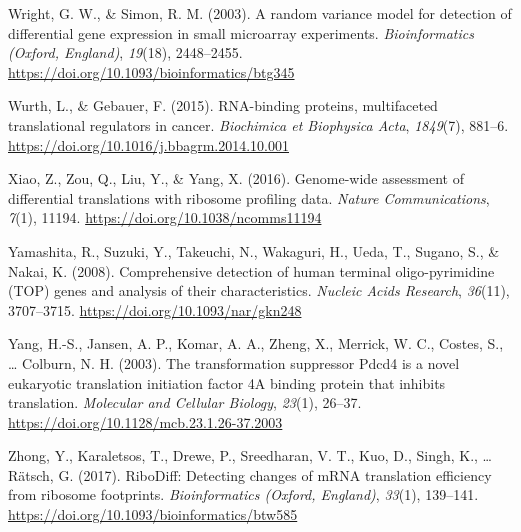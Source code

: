 \documentclass[12pt,openany]{book}
\begin{document}
\hypertarget{ref-Wright2003}{}
Wright, G. W., \& Simon, R. M. (2003). A random variance model for
detection of differential gene expression in small microarray
experiments. \emph{Bioinformatics (Oxford, England)}, \emph{19}(18),
2448--2455. \url{https://doi.org/10.1093/bioinformatics/btg345}

\hypertarget{ref-Wurth2015}{}
Wurth, L., \& Gebauer, F. (2015). RNA-binding proteins, multifaceted
translational regulators in cancer. \emph{Biochimica et Biophysica
Acta}, \emph{1849}(7), 881--6.
\url{https://doi.org/10.1016/j.bbagrm.2014.10.001}

\hypertarget{ref-Xiao2016}{}
Xiao, Z., Zou, Q., Liu, Y., \& Yang, X. (2016). Genome-wide assessment
of differential translations with ribosome profiling data. \emph{Nature
Communications}, \emph{7}(1), 11194.
\url{https://doi.org/10.1038/ncomms11194}

\hypertarget{ref-Yamashita2008}{}
Yamashita, R., Suzuki, Y., Takeuchi, N., Wakaguri, H., Ueda, T., Sugano,
S., \& Nakai, K. (2008). Comprehensive detection of human terminal
oligo-pyrimidine (TOP) genes and analysis of their characteristics.
\emph{Nucleic Acids Research}, \emph{36}(11), 3707--3715.
\url{https://doi.org/10.1093/nar/gkn248}

\hypertarget{ref-Yang2003}{}
Yang, H.-S., Jansen, A. P., Komar, A. A., Zheng, X., Merrick, W. C.,
Costes, S., \ldots{} Colburn, N. H. (2003). The transformation
suppressor Pdcd4 is a novel eukaryotic translation initiation factor 4A
binding protein that inhibits translation. \emph{Molecular and Cellular
Biology}, \emph{23}(1), 26--37.
\url{https://doi.org/10.1128/mcb.23.1.26-37.2003}

\hypertarget{ref-Zhong2017}{}
Zhong, Y., Karaletsos, T., Drewe, P., Sreedharan, V. T., Kuo, D., Singh,
K., \ldots{} Rätsch, G. (2017). RiboDiff: Detecting changes of mRNA
translation efficiency from ribosome footprints. \emph{Bioinformatics
(Oxford, England)}, \emph{33}(1), 139--141.
\url{https://doi.org/10.1093/bioinformatics/btw585}
\end{document}
